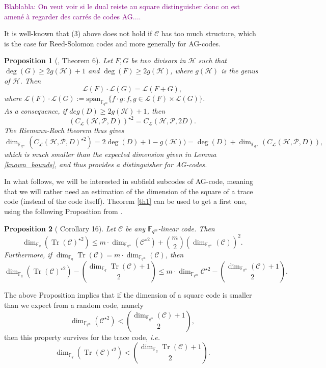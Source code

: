 \documentclass[a4paper]{article}
\newtheorem{prop1}{Proposition}
\newcommand{\calP}{\mathcal{P}}
\newcommand{\calH}{\mathcal{H}}
\newcommand{\calL}{\mathcal{L}}
\newcommand{\calC}{\mathcal{C}}
\newcommand{\Tr}{\operatorname{Tr}}
\newcommand{\fqm}{\mathbb{F}_{q^m}}
\newcommand{\fq}{\mathbb{F}_{q}}
\newcommand\jade[1]{\textcolor{purple}{#1}}
\begin{document}
\jade{Blablabla: On veut voir si le dual reiste au square distinguisher donc on est amené à regarder des carrés de codes AG....}

It is well-known that (3) above does not hold if $\calC$ has too much structure, which is the case for Reed-Solomon codes and more generally for AG-codes.

\begin{prop1}[\cite{mumford}, Theorem 6] \label{prop1}
Let $F,G$ be two divisors in $\calH$ such that $\deg(G) \geq 2g(\calH)+1$ and $\deg(F) \geq 2g(\calH)$, where $g(\calH)$ is the genus of $\calH$. Then
\[ \calL(F) \cdot \calL(G) = \calL(F+G),\]
where $\calL(F) \cdot \calL(G) := \mathrm{span}_{\mathbb{F}_{q^m}}\{ f \cdot g : f,g \in \calL(F) \times \calL(G) \}$.\\ 
As a consequence, if $deg(D) \geq 2g(\calH)+1$, then 
\[ (C_{\calL}(\calH,\mathcal{P},D))^{\star2} = C_{\calL}(\calH,\calP,2D).\]
The Riemann-Roch theorem thus gives
\[ \dim_{\mathbb{F}_{q^m}}(C_{\calL}(\calH,\mathcal{P},D)^{\star2}) = 2\deg(D)+1-g(\calH)) = \deg(D) + \dim_{\fqm}(C_{\calL}(\calH,\mathcal{P},D)), \]
which is much smaller than the expected dimension given in Lemma \ref{known_bounds}, and thus provides a distinguisher for AG-codes.
\end{prop1}

In what follows, we will be interested in subfield subcodes of AG-code, meaning that we will rather need an estimation of the dimension of the square of a trace code (instead of the code itself). Theorem \ref{th1} can be used to get a first one, using the following Proposition from \cite{rocco}.

\begin{prop1} [\cite{rocco} Corollary 16]\label{1st bound square of trace}
Let $\calC$ be any $\fqm$-linear code. Then 
\begin{equation} \label{bbbound}
    \dim_{\fq}(\Tr(\mathcal{C})^{\star2}) \leq m \cdot \dim_{\fqm}(\calC^{\star 2}) + \binom{m}{2} (\dim_{\fqm}(\calC))^2.
\end{equation}
Furthermore, if $\dim_{\fq} \Tr(\calC) = m \cdot \dim_{\fqm}(\calC)$, then 
\[\dim_{\fq} (\Tr(\calC)^{\star 2}) - \binom{\dim_{\fq} \Tr(\calC)+1}{2} \leq m \cdot \dim_{\fqm} \calC^{\star 2} - \binom{\dim_{\fqm} (\calC)+1}{2}.\]
\end{prop1}

The above Proposition implies that if the dimension of a square code is smaller than we expect from a random code, namely
\[ \dim_{\fqm} (\calC^{\star 2}) < \binom{\dim_{\fqm} (\calC)+1}{2},\]
then this property survives for the trace code, \emph{\textit{i.e.}}
\[\dim_{\fq} (\Tr(\calC)^{\star 2}) < \binom{\dim_{\fq} \Tr(\calC)+1}{2}.\]
\end{document}
